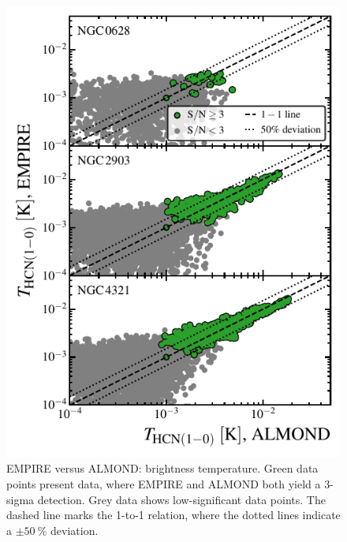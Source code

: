 \documentclass[letter, longauth]{aa} %
\begin{document}
\begin{appendix}
\begin{figure}
\centering
\includegraphics[width=\columnwidth]{Figures/ALMOND_vs_EMPIRE_brightness_temperatures_compressed.pdf}
\caption{EMPIRE versus ALMOND: \hcnone brightness temperature.
Green data points present data, where EMPIRE and ALMOND both yield a 3-sigma detection.
Grey data shows low-significant data points.
The dashed line marks the 1-to-1 relation, where the dotted lines indicate a $\pm\SI{50}{\percent}$ deviation.
}
\label{fig:empire_vs_almond_brightness_temp}
\end{figure}


\end{appendix}
\end{document}
